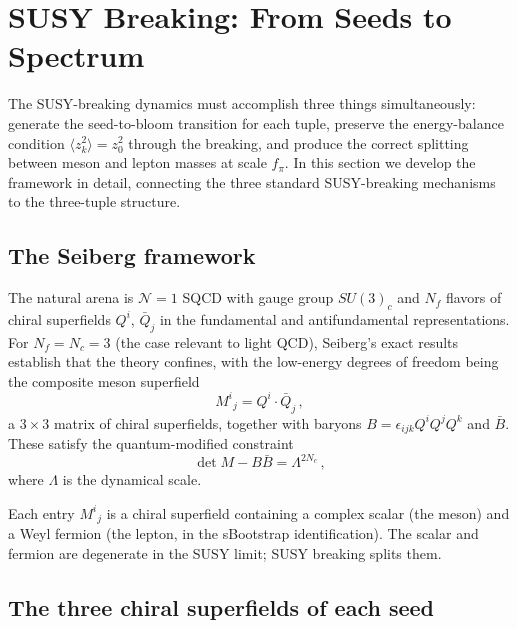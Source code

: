\documentclass[12pt,a4paper]{article}
\begin{document}
\section{SUSY Breaking: From Seeds to Spectrum}
\label{sec:breaking}

The SUSY-breaking dynamics must accomplish three things simultaneously:
generate the seed-to-bloom transition for each tuple, preserve the 
energy-balance condition $\langle z_k^2\rangle = z_0^2$ through the 
breaking, and produce the correct splitting between meson and lepton 
masses at scale $f_\pi$. In this section we develop the framework in 
detail, connecting the three standard SUSY-breaking mechanisms to the 
three-tuple structure.

\subsection{The Seiberg framework}

The natural arena is $\mathcal{N}=1$ SQCD with gauge group $SU(3)_c$ 
and $N_f$ flavors of chiral superfields $Q^i$, $\bar{Q}_j$ in the 
fundamental and antifundamental representations. For $N_f = N_c = 3$ 
(the case relevant to light QCD), Seiberg's exact results 
\cite{Seiberg1995} establish that the theory confines, with the 
low-energy degrees of freedom being the composite meson superfield
\begin{equation}
M^i{}_j = Q^i \cdot \bar{Q}_j\,,
\end{equation}
a $3\times 3$ matrix of chiral superfields, together with baryons 
$B = \epsilon_{ijk}Q^iQ^jQ^k$ and $\bar{B}$. These satisfy the 
quantum-modified constraint
\begin{equation}
\label{eq:seiberg}
\det M - B\bar{B} = \Lambda^{2N_c}\,,
\end{equation}
where $\Lambda$ is the dynamical scale.

Each entry $M^i{}_j$ is a chiral superfield containing a complex 
scalar (the meson) and a Weyl fermion (the lepton, in the sBootstrap 
identification). The scalar and fermion are degenerate in the SUSY 
limit; SUSY breaking splits them.

\subsection{The three chiral superfields of each seed}
\end{document}
